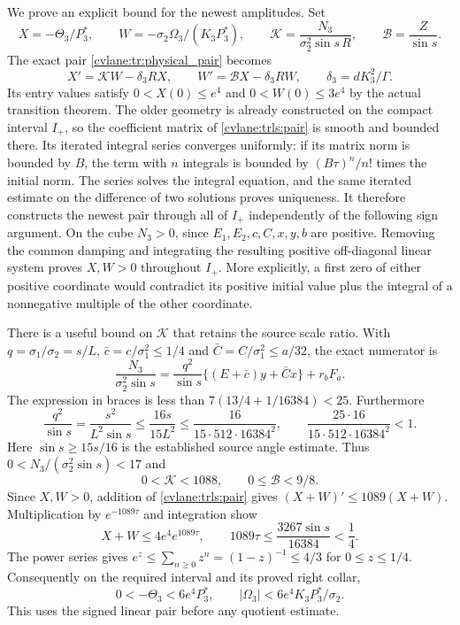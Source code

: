We prove an explicit bound for the newest amplitudes. Set
\[
 X=-\Theta_3/P_3^*,\qquad
 W=-\sigma_2\Omega_3/(K_3P_3^*),\qquad
 \mathcal K=\frac{N_3}{\sigma_2^2\sin s\,R},\qquad
 \mathcal B=\frac Z{\sin s}.
\]
The exact pair \eqref{cvlane:tr:physical_pair} becomes
\begin{equation}\label{cvlane:trls:pair}
 X'=\mathcal K W-\delta_3RX,\qquad
 W'=\mathcal B X-\delta_3RW,
 \qquad \delta_3=dK_3^2/\Gamma.
\end{equation}
Its entry values satisfy $0<X(0)\leq e^4$ and
$0<W(0)\leq3e^4$ by the actual transition theorem.
The older geometry is already constructed on the compact interval
$I_+$, so the coefficient matrix of \eqref{cvlane:trls:pair} is smooth
and bounded there. Its iterated integral series converges uniformly:
if its matrix norm is bounded by $B$, the term with $n$ integrals
is bounded by $(B\tau)^n/n!$ times the initial norm.
The series solves the integral equation, and the same iterated
estimate on the difference of two solutions proves uniqueness.
It therefore constructs the newest pair through all of $I_+$
independently of the following sign argument.
On the cube $N_3>0$, since $E_1,E_2,c,C,x,y,b$ are positive.
Removing the common damping and integrating the resulting positive
off-diagonal linear system proves $X,W>0$ throughout $I_+$.
More explicitly, a first zero of either positive coordinate would
contradict its positive initial value plus the integral of a
nonnegative multiple of the other coordinate.

There is a useful bound on $\mathcal K$ that retains the source
scale ratio. With $q=\sigma_1/\sigma_2=s/L$,
$\bar c=c/\sigma_1^2\leq1/4$ and
$\bar C=C/\sigma_1^2\leq a/32$, the exact numerator is
\[
 \frac{N_3}{\sigma_2^2\sin s}
 =\frac{q^2}{\sin s}\{(E+\bar c)y+\bar Cx\}
       +r_bF_a.
\]
The expression in braces is less than
$7(13/4+1/16384)<25$. Furthermore
\[
 \frac{q^2}{\sin s}=\frac{s^2}{L^2\sin s}
 \leq\frac{16s}{15L^2}
 \leq\frac{16}{15\cdot512\cdot16384^2},
 \qquad
 \frac{25\cdot16}{15\cdot512\cdot16384^2}<1.
\]
Here $\sin s\geq15s/16$ is the established source angle
estimate. Thus $0<N_3/(\sigma_2^2\sin s)<17$ and
\begin{equation}\label{cvlane:trls:pairbox}
 0<\mathcal K<1088,\qquad 0\leq\mathcal B<9/8.
\end{equation}
Since $X,W>0$, addition of \eqref{cvlane:trls:pair} gives
$(X+W)'\leq1089(X+W)$. Multiplication by
$e^{-1089\tau}$ and integration show
\[
 X+W\leq4e^4e^{1089\tau},\qquad
 1089\tau\leq\frac{3267\sin s}{16384}<\frac14.
\]
The power series gives $e^z\leq\sum_{n\geq0}z^n
=(1-z)^{-1}\leq4/3$ for $0\leq z\leq1/4$.
Consequently on the required interval and its proved right collar,
\begin{equation}\label{cvlane:trls:amplitudes}
 0<-\Theta_3<6e^4P_3^*,\qquad
 |\Omega_3|<6e^4K_3P_3^*/\sigma_2.
\end{equation}
This uses the signed linear pair before any quotient estimate.

